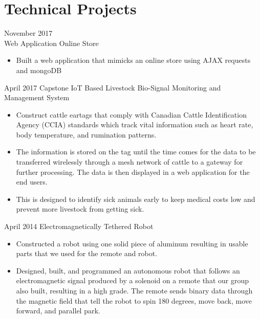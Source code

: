 \documentclass[]{friggeri-cv} %
\begin{document}
\section{Technical Projects}

\begin{entrylist}

\entry
{November 2017\\}
  {Web Application {\normalfont Online Store}}
{}
{
\begin{itemize}
\item Built a web application that mimicks an online store using AJAX requests
and mongoDB
\end{itemize}
}
\entry
{April 2017}
{Capstone {\normalfont IoT Based Livestock Bio-Signal Monitoring and Management System}}
{}
{
\begin{itemize}
\item Construct cattle eartags that comply with Canadian Cattle Identification
Agency (CCIA) standards which track vital information such as heart rate, body
temperature, and rumination patterns.
\item The information is stored on the tag until the time comes for the
data to be transferred wirelessly through a mesh network of cattle to a gateway
for further processing. The data is then displayed in a web application for the
end users.
\item This is designed to identify sick animals early to keep medical costs low
and prevent more livestock from getting sick.
\end{itemize}
}
\entry
{April 2014}
{Electromagnetically Tethered Robot}
{}
{
\begin{itemize}
\item Constructed a robot using one solid piece of aluminum resulting in usable
parts that we used for the remote and robot.
\item Designed, built, and programmed an autonomous robot that follows an
electromagnetic signal produced by a
solenoid on a remote that our group also built, resulting in a high grade. The
remote sends binary data through
the magnetic field that tell the robot to spin 180 degrees, move back, move
forward, and parallel park.
\end{itemize}
}
\end{entrylist}

\end{document}
